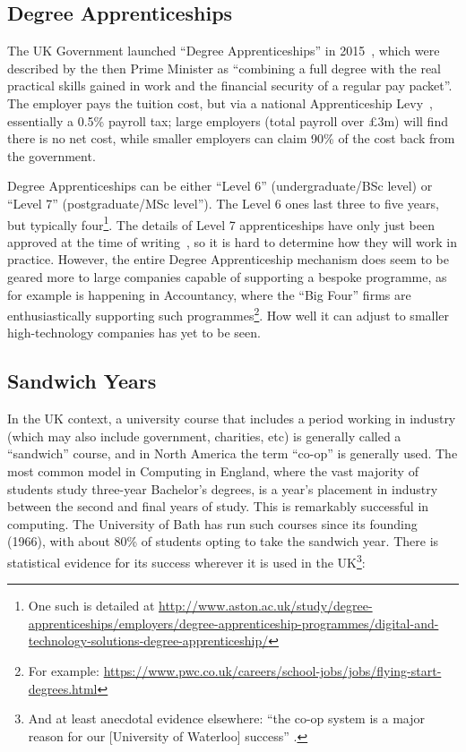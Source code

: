 \documentclass[conference]{IEEEtran}
\begin{document}
\subsection{Degree Apprenticeships}\label{sec:DA}

The UK Government launched ``Degree Apprenticeships'' in
2015~\cite{BIS2015a}, which were described by the then Prime Minister
as ``combining a full degree with the real practical skills gained in
work and the financial security of a regular pay packet''. The
employer pays the tuition cost, but via a national Apprenticeship
Levy~\cite{HMRC2016a}, essentially a 0.5\% payroll tax; large
employers (total payroll over \pounds3m) will find there is no net
cost, while smaller employers can claim 90\% of the cost back from the
government.

Degree Apprenticeships can be either ``Level 6'' (undergraduate/BSc
level) or ``Level 7'' (postgraduate/MSc level''). The Level 6 ones
last three to five years, but typically four\footnote{One such is
detailed at
\url{http://www.aston.ac.uk/study/degree-apprenticeships/employers/degree-apprenticeship-programmes/digital-and-technology-solutions-degree-apprenticeship/}}. The
details of Level 7 apprenticeships have only just been approved at the
time of writing~\cite{IfA2018a}, so it is hard to determine how they will work in
practice. However, the entire Degree Apprenticeship mechanism does
seem to be geared more to large companies capable of supporting a
bespoke programme, as for example is happening in Accountancy, where
the ``Big Four'' firms are enthusiastically supporting such
programmes\footnote{For example:
\url{https://www.pwc.co.uk/careers/school-jobs/jobs/flying-start-degrees.html}}. How
well it can adjust to smaller high-technology companies has yet to be
seen.

\subsection{Sandwich Years}

In the UK context, a university course that includes a period
working in industry (which may also include government, charities, etc) is
generally called a ``sandwich'' course, and in North America the term ``co-op''
is generally used. The most common model in Computing in England,
where the vast majority of students study three-year Bachelor's
degrees, is a year's placement in industry between the second and
final years of study. This is remarkably successful in computing. The
University of Bath has run such courses since its founding (1966),
with about 80\% of students opting to take the sandwich year. There is
statistical evidence for its success wherever it is used in the
UK\footnote{And at least anecdotal evidence elsewhere: ``the co-op
system is a major reason for our [University of Waterloo] success''
\cite{Watt2017a}.}:
\end{document}
